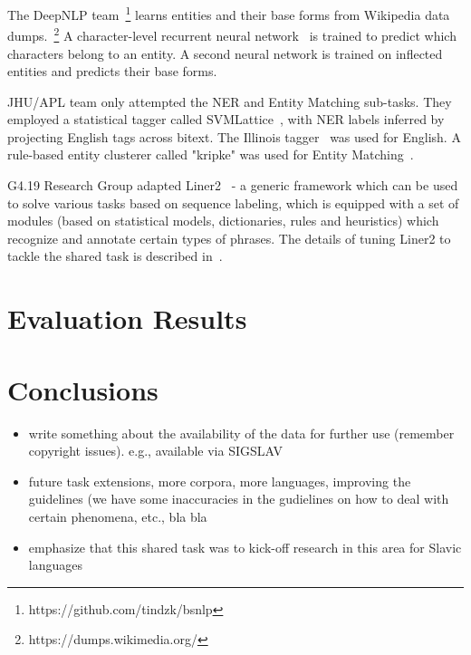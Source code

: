 \documentclass[11pt]{article}
\begin{document}
The {\sc DeepNLP} team~\footnote{https://github.com/tindzk/bsnlp} learns entities and their base forms from 
Wikipedia data dumps.~\footnote{https://dumps.wikimedia.org/} A character-level recurrent neural network~\cite{DBLP:conf/aaai/KimJSR16} 
is trained to predict which characters belong to an entity. A second neural network is trained on inflected entities and predicts their base forms.


JHU/APL team only attempted the NER and Entity Matching sub-tasks. They employed a statistical tagger called 
SVMLattice~\cite{Mayfield:2003:LTU:956863.956921}, with NER labels inferred by projecting English tags across bitext. 
The Illinois tagger~\cite{Ratinov:2009:DCM:1596374.1596399} was used for English. A rule-based entity clusterer 
called "kripke" was used for Entity Matching~\cite{DBLP:conf/tac/McNameeMFL13}.

{\sc G4.19 Research Group} adapted Liner2~\cite{series/sci/MarcinczukKJ13} - a generic framework 
which can be used to solve various tasks based on sequence labeling, which is equipped
with a set of modules (based on statistical models, dictionaries, rules and heuristics) 
which recognize and annotate certain types of phrases. The details of tuning Liner2 to
tackle the shared task is described in~\cite{marcinczuk:2017}.

\section{Evaluation Results}
\label{sec:results}


\section{Conclusions}
\label{sec:conclusions}


\begin{itemize}

\item write something about the availability of the data for further use (remember copyright issues). e.g.,
available via SIGSLAV 

\item future task extensions, more corpora, more languages, improving the guidelines (we have some inaccuracies
in the gudielines on how to deal with certain phenomena, etc., bla bla

\item emphasize that this shared task was to kick-off research in this area for Slavic languages

\end{itemize}
\end{document}
